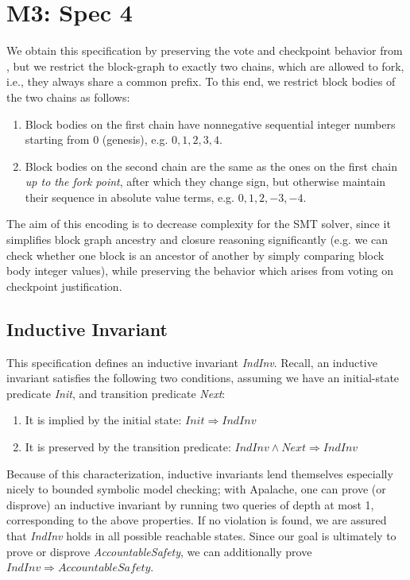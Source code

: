 
\section{M3: Spec 4}

We obtain this specification by preserving the vote and checkpoint behavior from \SpecThree{}, but we restrict the block-graph to exactly two chains, which are allowed to fork, i.e., they always share a common prefix.
To this end, we restrict block bodies of the two chains as follows:
\begin{enumerate}
	\item Block bodies on the first chain have nonnegative sequential integer numbers starting from 0 (genesis), e.g. $0, 1, 2,3, 4$.
	\item Block bodies on the second chain are the same as the ones on the first chain \emph{up to the fork point}, after which they change sign, but otherwise maintain their sequence in absolute value terms, e.g. $0, 1,2,-3,-4$.
\end{enumerate}

The aim of this encoding is to decrease complexity for the SMT solver, since it simplifies block graph ancestry and closure reasoning significantly (e.g. we can check whether one block is an ancestor of another by simply comparing block body integer values), while preserving the behavior which arises from voting on checkpoint justification.

\subsection{Inductive Invariant} 
This specification defines an inductive invariant \textit{IndInv}. Recall, an inductive invariant satisfies the following two conditions, assuming we have an initial-state predicate \textit{Init}, and transition predicate \textit{Next}:
\begin{enumerate}
	\item It is implied by the initial state: $\mathit{Init} \Rightarrow \mathit{IndInv}$
	\item It is preserved by the transition predicate: $\mathit{IndInv} \land \mathit{Next} \Rightarrow \mathit{IndInv}$
\end{enumerate}
Because of this characterization, inductive invariants lend themselves especially nicely to bounded symbolic model checking; with Apalache, one can prove (or disprove) an inductive invariant by running two queries of depth at most 1, corresponding to the above properties.
If no violation is found, we are assured that \textit{IndInv} holds in all possible reachable states.
Since our goal is ultimately to prove or disprove \textit{AccountableSafety}, we can additionally prove $\mathit{IndInv} \Rightarrow \mathit{AccountableSafety}$.

